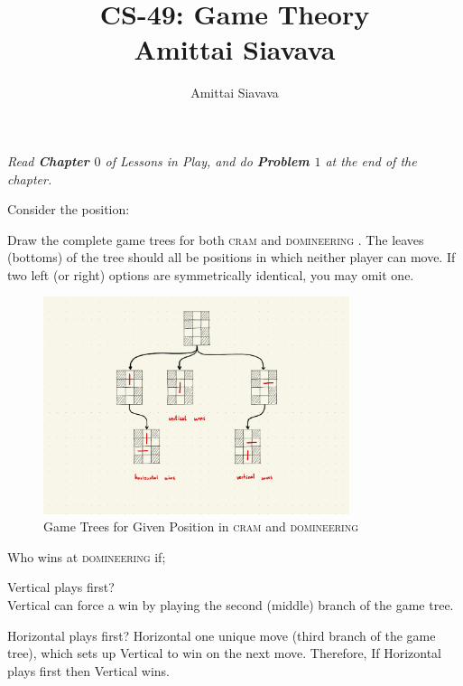 \documentclass[11pt, reqno]{amsart}
\begin{document}

\title{CS-49: Game Theory\\ Amittai Siavava \\ }
\author{Amittai Siavava}


\setlength{\headheight}{13.0pt}
\setlength{\footskip}{15.0pt}

\maketitle

\def \cram { \textsc{cram} }
\def \dom { \textsc{domineering} }

\newpage
\begin{problem}[4]
  \emph{Read \textbf{Chapter $0$} of Lessons in Play, and do \textbf{Problem $1$} at the end of the chapter.}

  \step
  Consider the position:

  \begin{enumalph}
    \item Draw the complete game trees for both \cram
      and \dom. The leaves (bottoms) of the tree
      should all be positions in which neither player can move.
      If two left (or right) options are symmetrically identical, you may omit one.

      \begin{figure}[H]
        
        \includegraphics[width=0.8\textwidth]{game-graph.pdf}
      
        \caption{Game Trees for Given Position in \cram and \dom}
      \end{figure}

    \item Who wins at \dom if;
      \begin{enumroman}
        \item Vertical plays first? \\
          Vertical can force a win by playing
          the second (middle) branch of the game tree.
        \item Horizontal plays first?
          Horizontal one unique move (third branch of the game tree),
          which sets up Vertical to win on the next move.
          Therefore, If Horizontal plays first then Vertical wins.
      \end{enumroman}
      

\end{enumalph}
\end{problem}
\end{document}
